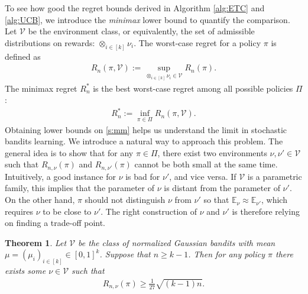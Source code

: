 \documentclass[10pt,a4paper]{amsart}
\numberwithin{equation}{section}
\theoremstyle{plain}
\newtheorem{Th}{Theorem}
\theoremstyle{definition}
\def\E{{\mathbb E}}
\def\V{{\mathcal V}}
\begin{document}
To see how good the regret bounds derived in Algorithm \ref{alg:ETC} and \ref{alg:UCB}, we introduce the \emph{minimax} lower bound to quantify the comparison. Let $\V$ be the environment class, or equivalently, the set of admissible distributions on rewards: $\otimes_{i\in [k]}\nu_i$. The worst-case regret for a policy $\pi$ is defined as 
\begin{align*}
R_n(\pi, \V):=\sup_{\otimes_{i\in [k]}\nu_i\in\V}R_n(\pi).
\end{align*}
The minimax regret $R_n^*$ is the best worst-case regret among all possible policies $\Pi$: 
\begin{align}
R_n^*:=\inf_{\pi\in\Pi}R_n(\pi, \V).\label{s:mm}
\end{align}
Obtaining lower bounds on \eqref{s:mm} helps us understand the limit in stochastic bandits learning. We introduce a natural way to approach this problem.  The general idea is to show that for any $\pi\in\Pi$, there exist two environments $\nu, \nu'\in\V$ such that $R_{n,\nu}(\pi)$ and $R_{n,\nu'}(\pi)$ cannot be both small at the same time. Intuitively, a good instance for $\nu$ is bad for $\nu'$, and vice versa. If $\V$ is a parametric family, this implies that the parameter of $\nu$ is distant from the parameter of $\nu'$. On the other hand, $\pi$ should not distinguish $\nu$ from $\nu'$ so that $\E_\nu\approx\E_{\nu'}$, which requires $\nu$ to be close to $\nu'$. The right construction of $\nu$ and $\nu'$ is therefore relying on finding a trade-off point.  
\begin{Th}\label{s:minimax}
Let $\V$ be the class of normalized Gaussian bandits with mean $\mu=(\mu_i)_{i\in [k]}\in [0,1]^k$. Suppose that $n\geq k-1$. Then for any policy $\pi$ there exists some $\nu\in\V$ such that
\begin{align}
R_{n,\nu}(\pi)\geq\frac{1}{27}\sqrt{(k-1)n}. \label{s:6}
\end{align}  
\end{Th}
\end{document}
